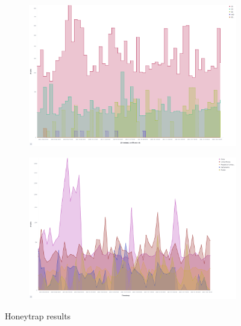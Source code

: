 \begin{figure}
    \centering

    \begin{subfigure}[b]{0.49\textwidth}
        \centering
        \includegraphics[width=\textwidth]{figures/tpot-cowire-attacks.png}
        \caption{}
        \label{fig:tpot-honeytrap-attacks}
    \end{subfigure}
    \hfill
    \begin{subfigure}[b]{0.49\textwidth}
        \centering
        \includegraphics[width=\textwidth]{figures/tpot-cowire-country.png}
        \caption{}
        \label{fig:tpot-honeytrap-country}
    \end{subfigure}
    \caption[Honeytrap results]{Honeytrap results}
    \label{fig:honeytrap-results}
\end{figure}


